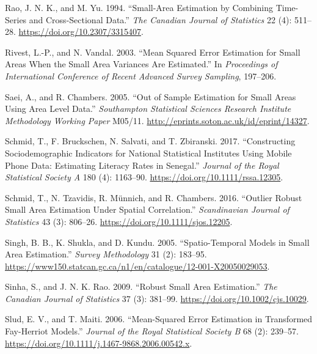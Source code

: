 \begin{CSLReferences}{1}{0}
\leavevmode{}%
Rao, J. N. K., and M. Yu. 1994. {``Small-Area Estimation by Combining Time-Series and Cross-Sectional Data.''} \emph{The Canadian Journal of Statistics} 22 (4): 511--28. \url{https://doi.org/10.2307/3315407}.

\leavevmode{}%
Rivest, L.-P., and N. Vandal. 2003. {``Mean Squared Error Estimation for Small Areas When the Small Area Variances Are Estimated.''} In \emph{Proceedings of International Conference of Recent Advanced Survey Sampling}, 197--206.

\leavevmode{}%
Saei, A., and R. Chambers. 2005. {``Out of Sample Estimation for Small Areas Using Area Level Data.''} \emph{Southampton Statistical Sciences Research Institute Methodology Working Paper} M05/11. \url{http://eprints.soton.ac.uk/id/eprint/14327}.

\leavevmode{}%
Schmid, T., F. Bruckschen, N. Salvati, and T. Zbiranski. 2017. {``Constructing Sociodemographic Indicators for National Statistical Institutes Using Mobile Phone Data: Estimating Literacy Rates in {Senegal}.''} \emph{Journal of the Royal Statistical Society A} 180 (4): 1163--90. \url{https://doi.org/10.1111/rssa.12305}.

\leavevmode{}%
Schmid, T., N. Tzavidis, R. Münnich, and R. Chambers. 2016. {``Outlier Robust Small Area Estimation Under Spatial Correlation.''} \emph{Scandinavian Journal of Statistics} 43 (3): 806--26. \url{https://doi.org/10.1111/sjos.12205}.

\leavevmode{}%
Singh, B. B., K. Shukla, and D. Kundu. 2005. {``Spatio-Temporal Models in Small Area Estimation.''} \emph{Survey Methodology} 31 (2): 183--95. \url{https://www150.statcan.gc.ca/n1/en/catalogue/12-001-X20050029053}.

\leavevmode{}%
Sinha, S., and J. N. K. Rao. 2009. {``Robust Small Area Estimation.''} \emph{The Canadian Journal of Statistics} 37 (3): 381--99. \url{https://doi.org/10.1002/cjs.10029}.

\leavevmode{}%
Slud, E. V., and T. Maiti. 2006. {``Mean-Squared Error Estimation in Transformed {Fay-Herriot} Models.''} \emph{Journal of the Royal Statistical Society B} 68 (2): 239--57. \url{https://doi.org/10.1111/j.1467-9868.2006.00542.x}.


\end{CSLReferences}
